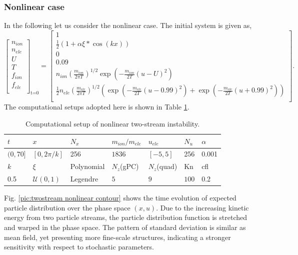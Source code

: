 \documentclass[preprint,3p,12pt,sort&compress]{elsarticle}
\begin{document}
\subsubsection{Nonlinear case}

In the following let us consider the nonlinear case.
The initial system is given as,
\begin{equation*}
\left[\begin{array}{c}
n_{ion} \\
n_{ele} \\
U \\
T \\
f_{ion} \\
f_{ele} \\
\end{array}\right]_{\text {t=0}}=\left[\begin{array}{c}
1 \\
\frac{1}{2} \left( 1 + \alpha \xi * \cos(kx) \right) \\
0 \\
0.09 \\
n_{ion} \left(\frac{m_{ion}}{2\pi T}\right)^{1/2} \exp\left(-\frac{m_{ion}}{2 T} (u-U)^2\right) \\
\frac{1}{2} n_{ele} \left(\frac{m_{ele}}{2\pi T}\right)^{1/2} 
\left( \exp\left(-\frac{m_{ele}}{2 T} (u-0.99)^2\right) + \exp\left(-\frac{m_{ele}}{2 T} (u+0.99)^2\right) \right) \\
\end{array}\right].
\end{equation*}
The computational setups adopted here is shown in Table \ref{tab:nonlinear twostream}.
\begin{table}[htbp]
	\caption{Computational setup of nonlinear two-stream instability.} 
	\centering
	\begin{tabular}{lllllll} 
		\toprule 
		$t$ & $x$ & $N_x$ & $m_{ion}/m_{ele}$ & $u_{ele}$ & $N_u$ & $\alpha$ \\ 
		\midrule 
		$(0,70]$ & $[0,2\pi/k]$ & 256 & $1836$ & $[-5,5]$ & 256 & 0.001 \\ 
		\midrule 
		$k$ & $\xi$ & Polynomial & $N_z$(gPC) & $N_z$(quad) & Kn & cfl \\ 
		\midrule 
		0.5 & $\mathcal U(0,1)$ & Legendre & $5$ & $9$ & $100$  & 0.2   \\ 
		\bottomrule 
	\end{tabular} 
	\label{tab:nonlinear twostream}
\end{table}

Fig. \ref{pic:twostream nonlinear contour} shows the time evolution of expected particle distribution over the phase space $(x,u)$.
Due to the increasing kinetic energy from two particle streams, the particle distribution function is stretched and warped in the phase space.
The pattern of standard deviation is similar as mean field, yet presenting more fine-scale structures, indicating a stronger sensitivity with respect to stochastic parameters.
\end{document}
